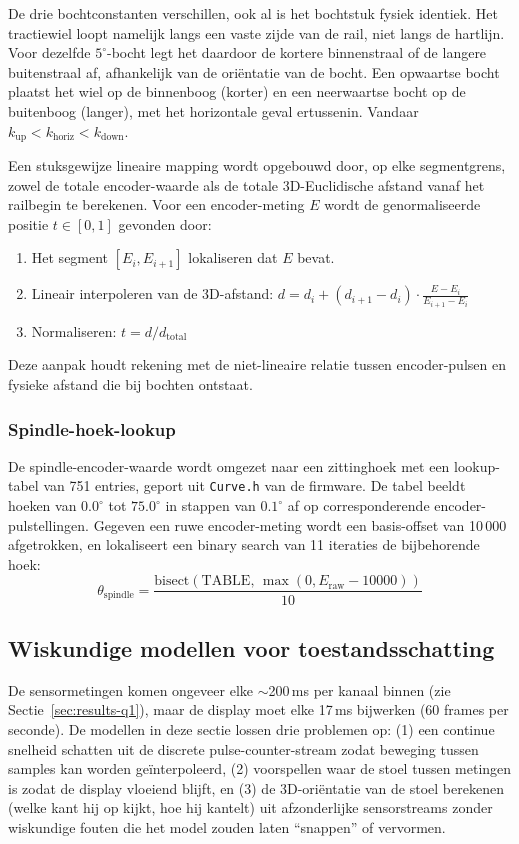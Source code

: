 \documentclass[10pt, a4paper, twocolumn]{article}
\begin{document}
De drie bochtconstanten verschillen, ook al is het bochtstuk fysiek identiek.
Het tractiewiel loopt namelijk langs een vaste zijde van de rail, niet langs de
hartlijn. Voor dezelfde $5^\circ$-bocht legt het daardoor de kortere binnenstraal
of de langere buitenstraal af, afhankelijk van de oriëntatie van de bocht. Een
opwaartse bocht plaatst het wiel op de binnenboog (korter) en een neerwaartse
bocht op de buitenboog (langer), met het horizontale geval ertussenin. Vandaar
$k_{\text{up}} < k_{\text{horiz}} < k_{\text{down}}$.

Een stuksgewijze lineaire mapping wordt opgebouwd door, op elke
segmentgrens, zowel de totale encoder-waarde als de totale
3D-Euclidische afstand vanaf het railbegin te berekenen. Voor een encoder-meting
$E$ wordt de genormaliseerde positie $t \in [0,1]$ gevonden door:
\begin{enumerate}[leftmargin=*]
  \item Het segment $[E_i, E_{i+1}]$ lokaliseren dat $E$ bevat.
  \item Lineair interpoleren van de 3D-afstand:
    $d = d_i + (d_{i+1} - d_i) \cdot \frac{E - E_i}{E_{i+1} - E_i}$
  \item Normaliseren: $t = d / d_{\text{total}}$
\end{enumerate}

Deze aanpak houdt rekening met de niet-lineaire relatie tussen encoder-pulsen
en fysieke afstand die bij bochten ontstaat.

\subsubsection{Spindle-hoek-lookup}
De spindle-encoder-waarde wordt omgezet naar een zittinghoek met een
lookup-tabel van 751 entries, geport uit \texttt{Curve.h} van de firmware. De
tabel beeldt hoeken van $0.0^\circ$ tot $75.0^\circ$ in stappen van $0.1^\circ$
af op corresponderende encoder-pulstellingen. Gegeven een ruwe encoder-meting
wordt een basis-offset van 10\,000 afgetrokken, en lokaliseert een binary search
van 11 iteraties de bijbehorende hoek:
\begin{equation}
\label{eq:spindle}
\theta_{\text{spindle}} = \frac{\text{bisect}(\text{TABLE},\, \max(0, E_{\text{raw}} \!-\! 10000))}{10}
\end{equation}

\subsection{Wiskundige modellen voor toestandsschatting}
\label{sec:results-q3}
De sensormetingen komen ongeveer elke $\sim$200\,ms per kanaal binnen (zie
Sectie~\ref{sec:results-q1}), maar de display moet elke 17\,ms bijwerken
(60 frames per seconde). De modellen in deze sectie lossen drie
problemen op: (1) een continue snelheid schatten uit de discrete
pulse-counter-stream zodat beweging tussen samples kan worden geïnterpoleerd,
(2) voorspellen waar de stoel tussen metingen is zodat de display vloeiend
blijft, en (3) de 3D-oriëntatie van de stoel berekenen (welke kant hij op kijkt,
hoe hij kantelt) uit afzonderlijke sensorstreams zonder wiskundige fouten die
het model zouden laten ``snappen'' of vervormen.
\end{document}
